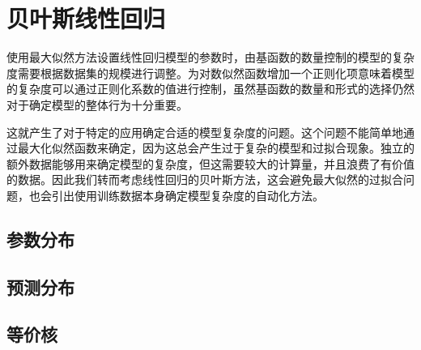 \section{贝叶斯线性回归}
使用最大似然方法设置线性回归模型的参数时，由基函数的数量控制的模型的复杂度需要根据数据集的规模进行调整。为对数似然函数增加一个正则化项意味着模型的复杂度可以通过正则化系数的值进行控制，虽然基函数的数量和形式的选择仍然对于确定模型的整体行为十分重要。

这就产生了对于特定的应用确定合适的模型复杂度的问题。这个问题不能简单地通过最大化似然函数来确定，因为这总会产生过于复杂的模型和过拟合现象。独立的额外数据能够用来确定模型的复杂度，但这需要较大的计算量，并且浪费了有价值的数据。因此我们转而考虑线性回归的贝叶斯方法，这会避免最大似然的过拟合问题，也会引出使用训练数据本身确定模型复杂度的自动化方法。
\subsection*{参数分布}
\subsection*{预测分布}
\subsection*{等价核}